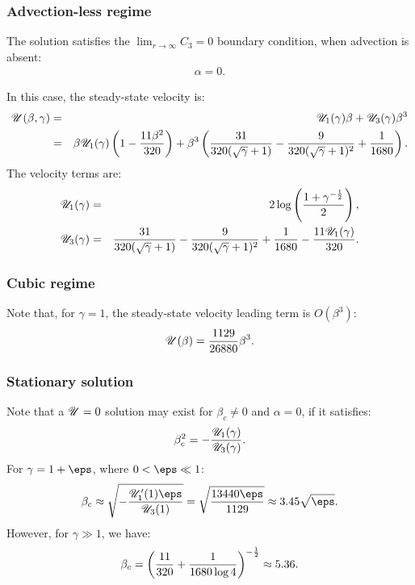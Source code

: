 \subsubsection{Advection-less regime}
The solution satisfies the $\lim_{r\rightarrow\infty}C_3 = 0$ boundary condition, 
when advection is absent:
\begin{eqnarray}
\alpha = 0.
\end{eqnarray}

In this case, the steady-state velocity is:
\begin{eqnarray}
\mathscr{U}(\beta, \gamma) &=& \mathscr{U}_1(\gamma) \beta + \mathscr{U}_3(\gamma) \beta^3 \\ &=&
\beta \mathscr{U}_1(\gamma) \left(1 - \frac{11\beta^2}{320}\right) + 
\beta^3 \left(\frac{31}{320(\sqrt\gamma + 1)} - \frac{9}{320(\sqrt\gamma + 1)^2} + \frac{1}{1680}\right).
\end{eqnarray}
The velocity terms are:
\begin{eqnarray}
\mathscr{U}_1(\gamma) &=& 2 \log \left(\frac{1 + \gamma^{-\frac{1}{2}}}{2}\right), \\
\mathscr{U}_3(\gamma) &=& \frac{31}{320(\sqrt\gamma + 1)} - \frac{9}{320(\sqrt\gamma + 1)^2} + \frac{1}{1680} - \frac{11 \mathscr{U}_1(\gamma)}{320}.
\end{eqnarray}

\subsubsection{Cubic regime}
Note that, for $\gamma = 1$, the steady-state velocity leading term is $O(\beta^3)$:
\begin{eqnarray}
\mathscr{U}(\beta) = \frac{1129}{26880}\beta^3.
\end{eqnarray}

\subsubsection{Stationary solution}
Note that a $\mathscr{U} = 0$ solution may exist for $\beta_c \ne 0$ and $\alpha = 0$, 
if it satisfies:
\begin{eqnarray}
\beta_c^2 = -\frac{\mathscr{U}_1(\gamma)}{\mathscr{U}_3(\gamma)}.
\end{eqnarray}
For $\gamma = 1 + \eps$, where $0 < \eps \ll 1$:
\begin{eqnarray}
\beta_c \approx \sqrt{-\frac{\cU_1'(1) \eps}{\cU_3(1)}} = 
 \sqrt{\frac{13440 \eps}{1129}} \approx 3.45 \sqrt{\eps}.
\end{eqnarray}
However, for $\gamma \gg 1$, we have:
\begin{eqnarray}
\beta_c =  \left(\frac{11}{320} + \frac{1}{1680 \log 4}\right)^{-\frac{1}{2}} \approx 5.36.
\end{eqnarray}